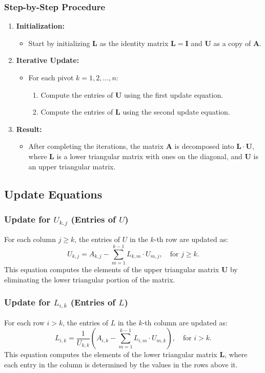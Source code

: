 \documentclass{beamer}
\numberwithin{equation}{section}
\begin{document}
\begin{frame}
\frametitle{Step-by-Step Procedure}
\begin{enumerate}
    \item \textbf{Initialization:} 
    \begin{itemize}
        \item Start by initializing $ \mathbf{L} $ as the identity matrix $ \mathbf{L} = \mathbf{I} $ and $ \mathbf{U} $ as a copy of $ \mathbf{A} $.
    \end{itemize}
    \item \textbf{Iterative Update:}
    \begin{itemize}
        \item For each pivot $ k = 1, 2, \ldots, n $:
        \begin{enumerate}
            \item Compute the entries of $ \mathbf{U} $ using the first update equation.
            \item Compute the entries of $ \mathbf{L} $ using the second update equation.
        \end{enumerate}
    \end{itemize}
    \item \textbf{Result:}
    \begin{itemize}
        \item After completing the iterations, the matrix $ \mathbf{A} $ is decomposed into $ \mathbf{L} \cdot \mathbf{U} $, where $ \mathbf{L} $ is a lower triangular matrix with ones on the diagonal, and $ \mathbf{U} $ is an upper triangular matrix.
    \end{itemize}
\end{enumerate}
\end{frame}

\subsection{Update Equations}
\begin{frame}
\frametitle{Update for $ U_{k,j} $ (Entries of $ U $)}
For each column $ j \geq k $, the entries of $ U $ in the $ k $-th row are updated as:
\[
U_{k,j} = A_{k,j} - \sum_{m=1}^{k-1} L_{k,m} \cdot U_{m,j}, \quad \text{for } j \geq k.
\]
This equation computes the elements of the upper triangular matrix $ \mathbf{U} $ by eliminating the lower triangular portion of the matrix.
\end{frame}

\begin{frame}
\frametitle{Update for $ L_{i,k} $ (Entries of $ L $)}
For each row $ i > k $, the entries of $ L $ in the $ k $-th column are updated as:
\[
L_{i,k} = \frac{1}{U_{k,k}} \left( A_{i,k} - \sum_{m=1}^{k-1} L_{i,m} \cdot U_{m,k} \right), \quad \text{for } i > k.
\]
This equation computes the elements of the lower triangular matrix $ \mathbf{L} $, where each entry in the column is determined by the values in the rows above it.
\end{frame}
\end{document}

